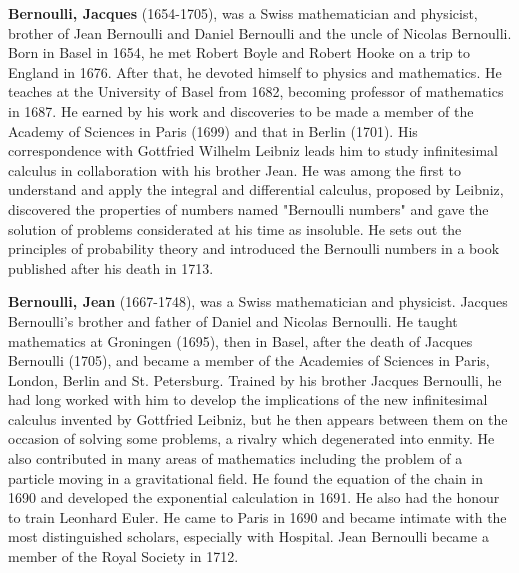 \textbf{Bernoulli, Jacques} (1654-1705), was a Swiss mathematician and physicist, brother of Jean Bernoulli and Daniel Bernoulli and the uncle of Nicolas Bernoulli. Born in Basel in 1654, he met Robert Boyle and Robert Hooke on a trip to England in 1676. After that, he devoted himself to physics and mathematics. He teaches at the University of Basel from 1682, becoming professor of mathematics in 1687. He earned by his work and discoveries to be made a member of the Academy of Sciences in Paris (1699) and that in Berlin (1701). His correspondence with Gottfried Wilhelm Leibniz leads him to study infinitesimal calculus in collaboration with his brother Jean. He was among the first to understand and apply the integral and differential calculus, proposed by Leibniz, discovered the properties of numbers named "Bernoulli numbers" and gave the solution of problems considerated at his time as insoluble. He sets out the principles of probability theory and introduced the Bernoulli numbers in a book published after his death in 1713.

\textbf{Bernoulli, Jean} (1667-1748), was a Swiss mathematician and physicist. Jacques Bernoulli's brother and father of Daniel and Nicolas Bernoulli. He taught mathematics at Groningen (1695), then in Basel, after the death of Jacques Bernoulli (1705), and became a member of the Academies of Sciences in Paris, London, Berlin and St. Petersburg. Trained by his brother Jacques Bernoulli, he had long worked with him to develop the implications of the new infinitesimal calculus invented by Gottfried Leibniz, but he then appears between them on the occasion of solving some problems, a rivalry which degenerated into enmity. He also contributed in many areas of mathematics including the problem of a particle moving in a gravitational field. He found the equation of the chain in 1690 and developed the exponential calculation in 1691. He also had the honour to train Leonhard Euler. He came to Paris in 1690 and became intimate with the most distinguished scholars, especially with Hospital. Jean Bernoulli became a member of the Royal Society in 1712.

